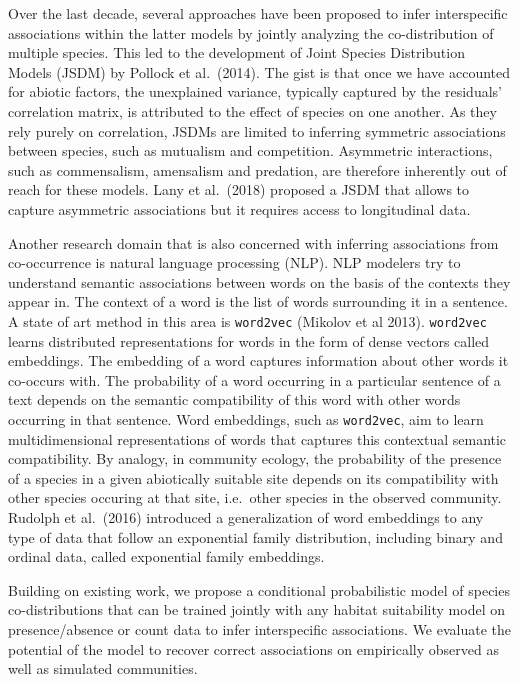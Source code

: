\documentclass[]{article}
\begin{document}
Over the last decade, several approaches have been proposed to infer
interspecific associations within the latter models by jointly
analyzing the co-distribution of multiple species. This led to the
development of Joint Species Distribution Models (JSDM) by Pollock et
al.\ (2014). The gist is that once we have accounted for abiotic
factors, the unexplained variance, typically captured by the residuals'
correlation matrix, is attributed to the effect of
species on one another. As they rely purely on correlation, JSDMs are
limited to inferring symmetric associations between species, such as
mutualism and competition. Asymmetric interactions, such as
commensalism, amensalism and predation, are therefore inherently out
of reach for these models. Lany et al.\ (2018) proposed a JSDM that
allows to capture asymmetric associations but it requires access to
longitudinal data.

\medskip Another research domain that is also concerned with inferring
associations from co-occurrence is natural language processing
(NLP). NLP modelers try to understand semantic associations between
words on the basis of the contexts they appear in. The context of a
word is the list of words surrounding it in a sentence. A state of art
method in this area is \texttt{word2vec} (Mikolov et al
2013). \texttt{word2vec} learns distributed representations for words
in the form of dense vectors called embeddings. The embedding of a
word captures information about other words it co-occurs with. The
probability of a word occurring in a particular sentence of a text
depends on the semantic compatibility of this word with other words
occurring in that sentence. Word embeddings, such as
\texttt{word2vec}, aim to learn multidimensional representations of
words that captures this contextual semantic compatibility. By
analogy, in community ecology, the probability of the presence of a
species in a given abiotically suitable site depends on its
compatibility with other species occuring at that site, i.e.\ other
species in the observed community.
Rudolph et al.\ (2016) introduced a generalization of word embeddings to
any type of data that follow an exponential family distribution,
including binary and ordinal data, called exponential family
embeddings.

Building on existing work, we propose a conditional
probabilistic model of species co-distributions that can be trained
jointly with any habitat suitability model on presence/absence or
count data to infer interspecific associations. We evaluate the
potential of the model to recover correct associations on empirically
observed as well as simulated communities.
\end{document}
